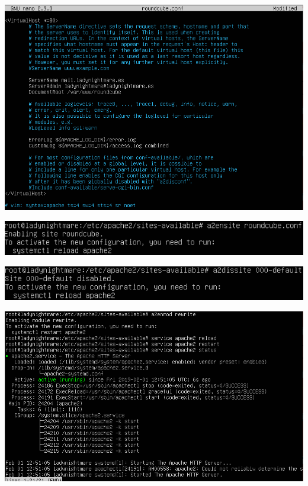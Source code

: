 \documentclass{article}
\begin{document}
\begin{center}
\includegraphics[scale=0.4]{images/rconf.png}
\end{center}

\begin{center}
\includegraphics[scale=0.6]{images/en.png}
\end{center}

\begin{center}
\includegraphics[scale=0.6]{images/dis.png}
\end{center}

\begin{center}
\includegraphics[scale=0.4]{images/status2.png}
\end{center}
\end{document}
